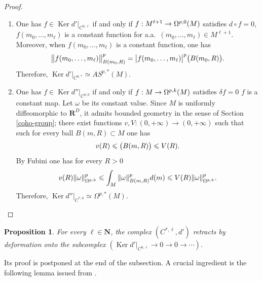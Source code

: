 \documentclass[JEP,XML,SOM,Unicode,published]{cedram}
\newcommand{\NoChangel}[1]{%
\expandafter\let\csname old\string#1\endcsname=#1
\let#1=\relax
\newcommand{#1}{\mathcode`l="716C\csname old\string#1\endcsname\mathcode`l="7160 }%
}
\newcommand{\loc}{\mathrm{loc}}\NoChangel{\loc}
\newcommand{\NN}{\mathbf{N}}
\newcommand{\RR}{\mathbf{R}}
\theoremstyle{plain}
\newtheorem{proposition}[equation]{Proposition}
\theoremstyle{remark}
\theoremstyle{definition}
\DeclareMathOperator{\Ker}{Ker}
\DeclareMathOperator{\vol}{vol}\NoChangel{\vol}
\newcommand{\restr}{\big|}
\begin{document}
\skpt
\begin{proof}
\begin{enumerate}
\item
One has $f \in \Ker d' \restr_{C^{0, \ell}}$ if and only if $f: M^{\ell +1} \to \Omega_{\loc}^{p, 0}(M)$
satisfies $d \circ f =0$,
\ie $f(m_0, \dots, m_\ell)$ is a constant function for a.a.\ $(m_0, \dots, m_\ell) \in M^{\ell +1}$.
Moreover, when $f(m_0, \dots, m_\ell)$ is a constant function, one has
\[\bigl\Vert f(m_0, \dots, m_\ell) \bigr\Vert_{B(m_0,R)}^p =
\bigl\vert f(m_0, \dots, m_\ell) \bigr\vert^p \vol\bigl(B(m_0, R)\bigr).\]
Therefore, $\Ker d' \restr_{C^{0, *}} \simeq AS^{p, *}(M)$.

\item
One has $f \in \Ker d'' \restr_{C^{k, 0}}$ if and only if $f: M \to \Omega_{\loc}^{p, k}(M)$
satisfies $\delta f =0$ \ie 
$f$ is a constant map. Let $\omega$ be its constant value.
Since $M$ is uniformly diffeomorphic to $\RR^D$, it admits bounded geometry
in the sense of Section \ref{coho-group}; there exist functions $v, V: (0, +\infty) \to (0, +\infty)$
such that such for every ball
$B(m, R) \subset M$ one has
\[v(R) \leqslant \vol\bigl(B(m,R)\bigr) \leqslant V(R).\]
By Fubini one has for every $R>0$
\[v(R) \Vert \omega \Vert^p_{\Omega^{p,k}} \leqslant \int_M \Vert \omega \Vert^p_{B(m, R)} d\vol(m)
\leqslant V(R) \Vert \omega \Vert^p_{\Omega^{p,k}}.\]
Therefore, $\Ker d'' \restr_{C^{*, 0}} \simeq \Omega^{p, *}(M)$.\qedhere
\end{enumerate}
\end{proof}


\begin{proposition} \label{appendix-proposition2} For every $\ell \in \NN$, the complex $(C^{*, \ell}, d')$
retracts by deformation onto the subcomplex $(\Ker d' \restr_{C^{0, \ell}} \to 0 \to 0 \to \cdots)$.
\end{proposition}
Its proof is postponed at the end of the subsection. A crucial ingredient is the following lemma
issued from \cite[\S 4]{IL93}.
\end{document}
